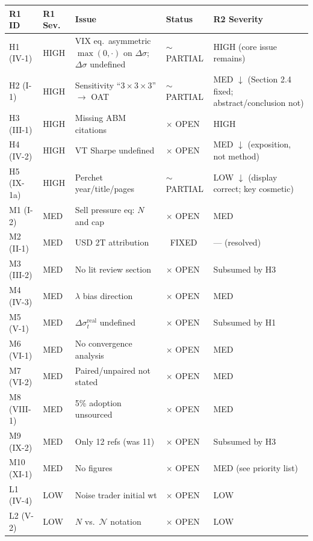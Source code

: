 \documentclass[12pt,a4paper]{article}
\newcommand{\FIXED}{\textcolor{okgreen}{\checkmark\ FIXED}}
\newcommand{\PARTIAL}{\textcolor{warncolor}{$\sim$ PARTIAL}}
\newcommand{\OPEN}{\textcolor{errorred}{$\times$ OPEN}}
\begin{document}
{
\footnotesize
\begin{longtable}{@{}p{1.2cm}p{1.2cm}p{5cm}p{1.5cm}p{3.5cm}@{}}
\toprule
\textbf{R1 ID} & \textbf{R1 Sev.} & \textbf{Issue} & \textbf{Status} & \textbf{R2 Severity} \\
\midrule
\endhead
H1 (IV-1) & HIGH & VIX eq.\ asymmetric $\max(0,\cdot)$ on $\Delta\sigma$; $\Delta\sigma$ undefined & \PARTIAL & \textcolor{errorred}{HIGH} (core issue remains) \\
H2 (I-1) & HIGH & Sensitivity ``$3\!\times\!3\!\times\!3$'' $\to$ OAT & \PARTIAL & \textcolor{warncolor}{MED} $\downarrow$ (Section 2.4 fixed; abstract/conclusion not) \\
H3 (III-1) & HIGH & Missing ABM citations & \OPEN & \textcolor{errorred}{HIGH} \\
H4 (IV-2) & HIGH & VT Sharpe undefined & \OPEN & \textcolor{warncolor}{MED} $\downarrow$ (exposition, not method) \\
H5 (IX-1a) & HIGH & Perchet year/title/pages & \PARTIAL & \textcolor{okgreen}{LOW} $\downarrow$ (display correct; key cosmetic) \\
\midrule
M1 (I-2) & MED & Sell pressure eq: $N$ and cap & \OPEN & \textcolor{warncolor}{MED} \\
M2 (II-1) & MED & USD 2T attribution & \FIXED & --- (resolved) \\
M3 (III-2) & MED & No lit review section & \OPEN & Subsumed by H3 \\
M4 (IV-3) & MED & $\lambda$ bias direction & \OPEN & \textcolor{warncolor}{MED} \\
M5 (V-1) & MED & $\Delta\sigma^{\text{real}}_t$ undefined & \OPEN & Subsumed by H1 \\
M6 (VI-1) & MED & No convergence analysis & \OPEN & \textcolor{warncolor}{MED} \\
M7 (VI-2) & MED & Paired/unpaired not stated & \OPEN & \textcolor{warncolor}{MED} \\
M8 (VIII-1) & MED & 5\% adoption unsourced & \OPEN & \textcolor{warncolor}{MED} \\
M9 (IX-2) & MED & Only 12 refs (was 11) & \OPEN & Subsumed by H3 \\
M10 (XI-1) & MED & No figures & \OPEN & \textcolor{warncolor}{MED} (see priority list) \\
\midrule
L1 (IV-4) & LOW & Noise trader initial wt & \OPEN & \textcolor{okgreen}{LOW} \\
L2 (V-2) & LOW & $N$ vs.\ $\mathcal{N}$ notation & \OPEN & \textcolor{okgreen}{LOW} \\

\end{longtable}}
\end{document}

